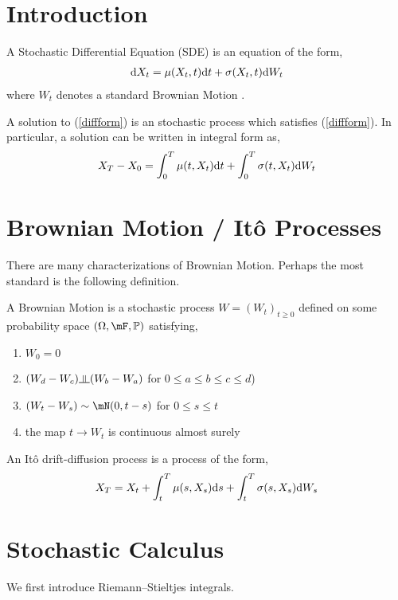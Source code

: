 \documentclass[11pt]{article}
\newcommand{\indep}{\rotatebox[origin=c]{90}{$\models$}}
\begin{document}
\maketitle

\section{Introduction}
A Stochastic Differential Equation (SDE) is an equation of the form,
\begin{align}
    \mathrm{d} X_t =  \mu(X_t,t)\mathrm{d} t + \sigma(X_t,t)\mathrm{d} W_t \label{diffform}
\end{align}
where \( W_t \) denotes a standard Brownian Motion \cite{lorig}.

A solution to (\ref{diffform}) is an stochastic process which satisfies (\ref{diffform}). In particular, a solution can be written in integral form as,
\begin{align}
    X_{T} - X_{0} = \int_{0}^{T} \mu(t,X_t)\mathrm{d} t + \int_{0}^{T} \sigma(t,X_t) \mathrm{d} W_t \label{intform}
\end{align}

\section{Brownian Motion / It\^o Processes}
There are many characterizations of Brownian Motion. Perhaps the most standard is the following definition.
\begin{definition}
A Brownian Motion is a stochastic process \( W = (W_t)_{t\geq0} \) defined on some probability space \( (\Omega,\mF,\bP) \) satisfying,
\begin{enumerate}[nolistsep]
    \item \( W_0 = 0 \)
    \item \( (W_d-W_c) \indep (W_b-W_a) \) for \( 0\leq a\leq b\leq c\leq d \))
    \item \( (W_t - W_s) \sim \mN(0,t-s) \) for \( 0\leq s\leq t \)
    \item the map \( t \to W_t \) is continuous almost surely
\end{enumerate}
\end{definition}

An It\^o drift-diffusion process is a process of the form,
\begin{align*}
    X_T = X_t +  \int_t^T \mu(s,X_s)\mathrm{d} s + \int_t^T \sigma(s,X_s)\mathrm{d} W_s
\end{align*}


\section{Stochastic Calculus}
We first introduce Riemann--Stieltjes integrals.
\end{document}
